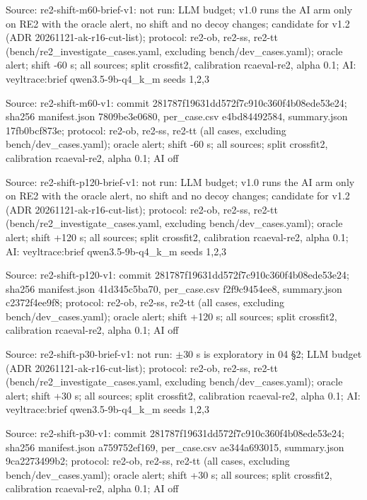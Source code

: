 \noindent Source: re2-shift-m60-brief-v1: not run: LLM budget; v1.0 runs the AI arm only on RE2 with the oracle alert, no shift and no decoy changes; candidate for v1.2 (ADR 20261121-ak-r16-cut-list); protocol: re2-ob, re2-ss, re2-tt (bench/\allowbreak{}re2\_investigate\_cases.yaml, excluding bench/\allowbreak{}dev\_cases.yaml); oracle alert; shift -60 s; all sources; split crossfit2, calibration rcaeval-re2, alpha 0.1; AI: veyltrace:brief qwen3.5-9b-q4\_k\_m seeds 1,2,3\par
\noindent Source: re2-shift-m60-v1: commit 281787f19631dd572f7c910c360f4b08ede53e24; sha256 manifest.json 7809be3e0680, per\_case.csv e4bd84492584, summary.json 17fb0bcf873e; protocol: re2-ob, re2-ss, re2-tt (all cases, excluding bench/\allowbreak{}dev\_cases.yaml); oracle alert; shift -60 s; all sources; split crossfit2, calibration rcaeval-re2, alpha 0.1; AI off\par
\noindent Source: re2-shift-p120-brief-v1: not run: LLM budget; v1.0 runs the AI arm only on RE2 with the oracle alert, no shift and no decoy changes; candidate for v1.2 (ADR 20261121-ak-r16-cut-list); protocol: re2-ob, re2-ss, re2-tt (bench/\allowbreak{}re2\_investigate\_cases.yaml, excluding bench/\allowbreak{}dev\_cases.yaml); oracle alert; shift +120 s; all sources; split crossfit2, calibration rcaeval-re2, alpha 0.1; AI: veyltrace:brief qwen3.5-9b-q4\_k\_m seeds 1,2,3\par
\noindent Source: re2-shift-p120-v1: commit 281787f19631dd572f7c910c360f4b08ede53e24; sha256 manifest.json 41d345c5ba70, per\_case.csv f2f9c9454ee8, summary.json c2372f4ee9f8; protocol: re2-ob, re2-ss, re2-tt (all cases, excluding bench/\allowbreak{}dev\_cases.yaml); oracle alert; shift +120 s; all sources; split crossfit2, calibration rcaeval-re2, alpha 0.1; AI off\par
\noindent Source: re2-shift-p30-brief-v1: not run: $\pm$30 s is exploratory in 04 \S{}2; LLM budget (ADR 20261121-ak-r16-cut-list); protocol: re2-ob, re2-ss, re2-tt (bench/\allowbreak{}re2\_investigate\_cases.yaml, excluding bench/\allowbreak{}dev\_cases.yaml); oracle alert; shift +30 s; all sources; split crossfit2, calibration rcaeval-re2, alpha 0.1; AI: veyltrace:brief qwen3.5-9b-q4\_k\_m seeds 1,2,3\par
\noindent Source: re2-shift-p30-v1: commit 281787f19631dd572f7c910c360f4b08ede53e24; sha256 manifest.json a759752ef169, per\_case.csv ae344a693015, summary.json 9ca2273499b2; protocol: re2-ob, re2-ss, re2-tt (all cases, excluding bench/\allowbreak{}dev\_cases.yaml); oracle alert; shift +30 s; all sources; split crossfit2, calibration rcaeval-re2, alpha 0.1; AI off\par
